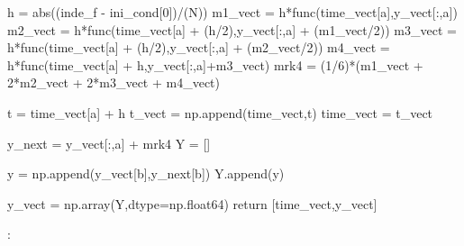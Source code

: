 \documentclass[12pt]{article}
\begin{document}
\begin{algorithm}

\begin{algorithmic}
      \State h = abs((inde\_f - ini\_cond[0])/(N))
        \State    m1\_vect = h*func(time\_vect[a],y\_vect[:,a])
          \State  m2\_vect = h*func(time\_vect[a] + (h/2),y\_vect[:,a] + (m1\_vect/2))
           \State m3\_vect = h*func(time\_vect[a] + (h/2),y\_vect[:,a] + (m2\_vect/2))
         \State   m4\_vect = h*func(time\_vect[a] + h,y\_vect[:,a]+m3\_vect)
          \State  mrk4 = (1/6)*(m1\_vect + 2*m2\_vect + 2*m3\_vect + m4\_vect)
            
         \State   t = time\_vect[a] + h
         \State   t\_vect = np.append(time\_vect,t)
          \State  time\_vect = t\_vect
        
         \State   y\_next = y\_vect[:,a] + mrk4
           \State Y = []
           
            \State y = np.append(y\_vect[b],y\_next[b])
             \State Y.append(y)
             \EndFor
        
           \State y\_vect = np.array(Y,dtype=np.float64)
            \EndFor
       \State return [time\_vect,y\_vect]
       
      \Else :
      
       \EndIf
\end{algorithmic} 
\end{algorithm}
\end{document}
